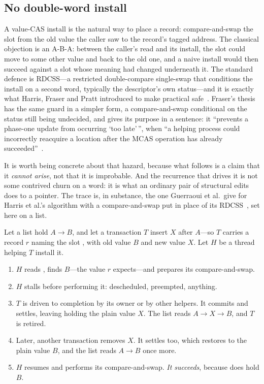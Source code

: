 \documentclass[11pt]{article}
\begin{document}
\subsection{No double-word install}
\label{sec:norddcss}

A value-CAS install is the natural way to place a record: compare-and-swap the
slot from the old value the caller saw to the record's tagged address. The
classical objection is an A-B-A: between the caller's read and its install, the
slot could move to some other value and back to the old one, and a naive install
would then succeed against a slot whose meaning had changed underneath it. The
standard defence is RDCSS---a restricted double-compare single-swap that
conditions the install on a second word, typically the descriptor's own
status---and it is exactly what Harris, Fraser and Pratt introduced to make
practical \mcas safe~\citep{harris2002mcas}. Fraser's thesis has the same guard
in a simpler form, a compare-and-swap conditional on the status still being
undecided, and gives its purpose in a sentence: it ``prevents a phase-one update
from occurring `too late'\,'', when ``a helping process could incorrectly
reacquire a location after the MCAS operation has already
succeeded''~\citep{fraser2004lockfreedom}.

It is worth being concrete about that hazard, because what follows is a claim
that it \emph{cannot arise}, not that it is improbable. And the recurrence that
drives it is not some contrived churn on a word: it is what an ordinary pair of
structural edits does to a pointer. The trace is, in substance, the one
Guerraoui et al.\ give for Harris et al.'s algorithm with a compare-and-swap put
in place of its RDCSS~\citep[Appendix~A.1]{guerraoui2020mcasfull}, set here on a
list.

Let a list hold $A \rightarrow B$, and let a transaction $T$ insert $X$ after
$A$---so $T$ carries a record $r$ naming the slot , with old value
$B$ and new value $X$. Let $H$ be a thread helping $T$ install it.

\begin{enumerate}\setlength{\itemsep}{1pt}
\item $H$ reads , finds $B$---the value $r$ expects---and prepares
      its compare-and-swap.
\item $H$ stalls before performing it: descheduled, preempted, anything.
\item $T$ is driven to completion by its owner or by other helpers. It commits
      and settles, leaving  holding the plain value $X$. The list
      reads $A \rightarrow X \rightarrow B$, and $T$ is retired.
\item Later, another transaction removes $X$. It settles too, which restores
       to the plain value $B$, and the list reads
      $A \rightarrow B$ once more.
\item $H$ resumes and performs its compare-and-swap. \emph{It succeeds}, because
       does hold $B$.
\end{enumerate}
\end{document}
